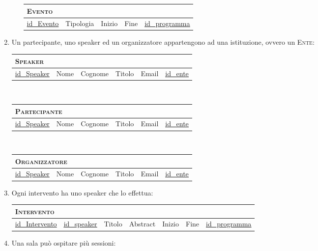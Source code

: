 \begin{enumerate}
\begin{enumerate}
	\begin{tabular}{|l|l|l|l|l|}
		\multicolumn{5}{l}{\textsc{Evento}} \\ \hline
		\underline{id\_Evento} & Tipologia & Inizio & Fine & \underline{\underline{id\_programma}} \\ \hline
	\end{tabular}

	\end{enumerate}
\item Un partecipante, uno speaker ed un organizzatore appartengono ad una istituzione, ovvero un \textsc{Ente}:

	\begin{tabular}{|l|l|l|l|l|l|}
		\multicolumn{6}{l}{\textsc{Speaker}} \\ \hline
		\underline{id\_Speaker} & Nome & Cognome & Titolo & Email & \underline{\underline{id\_ente}} \\ \hline
	\end{tabular} \\


	\begin{tabular}{|l|l|l|l|l|l|}
		\multicolumn{6}{l}{\textsc{Partecipante}} \\ \hline
		\underline{id\_Speaker} & Nome & Cognome & Titolo & Email & \underline{\underline{id\_ente}} \\ \hline
	\end{tabular} \\


	\begin{tabular}{|l|l|l|l|l|l|}
		\multicolumn{6}{l}{\textsc{Organizzatore}} \\ \hline
		\underline{id\_Speaker} & Nome & Cognome & Titolo & Email & \underline{\underline{id\_ente}} \\ \hline
	\end{tabular}

\item Ogni intervento ha uno speaker che lo effettua:

	\begin{tabular}{|l|l|l|l|l|l|l|}
		\multicolumn{6}{l}{\textsc{Intervento}} \\ \hline
		\underline{id\_Intervento} & \underline{\underline{id\_speaker}} & Titolo & Abstract & Inizio & Fine & \underline{\underline{id\_programma}}\\ \hline
	\end{tabular}

\item Una sala può ospitare più sessioni:


\end{enumerate}
